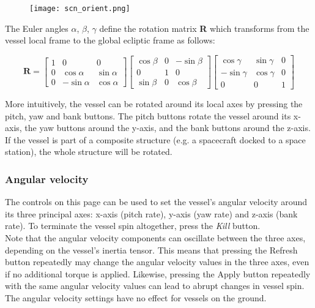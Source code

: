 \documentclass[Orbiter User Manual.tex]{subfiles}
\begin{document}
\begin{figure}[H]
	\centering
	\texttt{[image: scn\_orient.png]}
\end{figure}

\noindent
The Euler angles $\alpha$, $\beta$, $\gamma$ define the rotation matrix \textbf{R} which transforms from the vessel local frame to the global ecliptic frame as follows:

\[ \mathbf{R} = 
\begin{bmatrix}
1 & 0 & 0\\
0 & \cos \alpha & \sin \alpha\\
0 & -\sin \alpha & \cos \alpha
\end{bmatrix}
\begin{bmatrix}
\cos \beta & 0 & -\sin \beta\\
0 & 1 & 0\\
\sin \beta & 0 & \cos \beta
\end{bmatrix}
\begin{bmatrix}
\cos \gamma & \sin \gamma & 0\\
-\sin \gamma & \cos \gamma & 0\\
0 & 0 & 1
\end{bmatrix}
\]

\noindent
More intuitively, the vessel can be rotated around its local axes by pressing the pitch, yaw and bank buttons. The pitch buttons rotate the vessel around its x-axis, the yaw buttons around the y-axis, and the bank buttons around the z-axis.\\
If the vessel is part of a composite structure (e.g. a spacecraft docked to a space station), the whole structure will be rotated.

\subsubsection{Angular velocity}
The controls on this page can be used to set the vessel's angular velocity around its three principal axes: x-axis (pitch rate), y-axis (yaw rate) and z-axis (bank rate). To terminate the vessel spin altogether, press the \textit{Kill} button.\\
Note that the angular velocity components can oscillate between the three axes, depending on the vessel's inertia tensor. This means that pressing the Refresh button repeatedly may change the angular velocity values in the three axes, even if no additional torque is applied. Likewise, pressing the Apply button repeatedly with the same angular velocity values can lead to abrupt changes in vessel spin.\\
The angular velocity settings have no effect for vessels on the ground.
\end{document}

